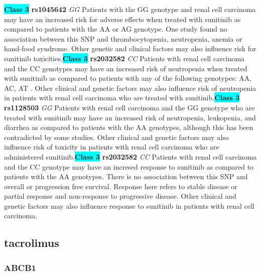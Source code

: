\documentclass{book}
\begin{document}
\begin{center}
\textbf{\colorbox{cyan} {Class 3}} \textbf{ rs1045642 } \textit{ GG }
Patients with the GG genotype and renal cell carcinoma may have an increased risk for adverse effects when treated with sunitinib as compared to patients with the AA or AG genotype. One study found no association between this SNP and thrombocytopenia, neutropenia, anemia or hand-food syndrome. Other genetic and clinical factors may also influence risk for sunitinib toxicities.\textbf{\colorbox{cyan} {Class 3}} \textbf{ rs2032582 } \textit{ CC }
Patients with renal cell carcinoma and the CC genotypes may have an increased risk of neutropenia when treated with sunitinib as compared to patients with any of the following genotypes: AA, AC, AT . Other clinical and genetic factors may also influence risk of neutropenia in patients with renal cell carcinoma who are treated with sunitinib.\textbf{\colorbox{cyan} {Class 3}} \textbf{ rs1128503 } \textit{ GG }
Patients with renal cell carcinoma and the GG genotype who are treated with sunitinib may have an increased risk of  neutropenia, leukopenia, and diarrhea as compared to patients with the AA genotypes, although this has been contradicted by some studies. Other clinical and genetic factors may also influence risk of toxicity in patients with renal cell carcinoma who are administered sunitinib.\textbf{\colorbox{cyan} {Class 3}} \textbf{ rs2032582 } \textit{ CC }
Patients with renal cell carcinoma and the CC genotype may have an incresed response to sunitinib as compared to patients with the AA genotypes. There is no association between this SNP and overall or progression free survival.   Response here refers to stable disease or partial response and non-response to progressive disease. Other clinical and genetic factors may also influence response to sunitinib in patients with renal cell carcinoma. 


\end{center}\subsection{ tacrolimus }


\subsubsection{ ABCB1 }
\end{document}
